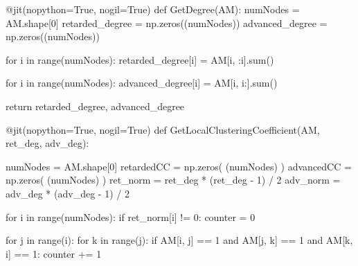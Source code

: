 \documentclass[
  letterpaper,
]{report}
\newenvironment{Shaded}{\begin{snugshade}}{\end{snugshade}}
\newcommand{\AttributeTok}[1]{\textcolor[rgb]{0.40,0.45,0.13}{#1}}
\newcommand{\BuiltInTok}[1]{\textcolor[rgb]{0.00,0.23,0.31}{#1}}
\newcommand{\ControlFlowTok}[1]{\textcolor[rgb]{0.00,0.23,0.31}{#1}}
\newcommand{\DecValTok}[1]{\textcolor[rgb]{0.68,0.00,0.00}{#1}}
\newcommand{\KeywordTok}[1]{\textcolor[rgb]{0.00,0.23,0.31}{#1}}
\newcommand{\NormalTok}[1]{\textcolor[rgb]{0.00,0.23,0.31}{#1}}
\newcommand{\OperatorTok}[1]{\textcolor[rgb]{0.37,0.37,0.37}{#1}}
\newcommand{\VariableTok}[1]{\textcolor[rgb]{0.07,0.07,0.07}{#1}}
\begin{document}
\begin{Shaded}
\begin{Highlighting}[]
\AttributeTok{@jit}\NormalTok{(nopython}\OperatorTok{=}\VariableTok{True}\NormalTok{, nogil}\OperatorTok{=}\VariableTok{True}\NormalTok{) }
\KeywordTok{def}\NormalTok{ GetDegree(AM):}
\NormalTok{    numNodes }\OperatorTok{=}\NormalTok{ AM.shape[}\DecValTok{0}\NormalTok{]}
\NormalTok{    retarded\_degree }\OperatorTok{=}\NormalTok{ np.zeros((numNodes))}
\NormalTok{    advanced\_degree }\OperatorTok{=}\NormalTok{ np.zeros((numNodes))}
     
    \ControlFlowTok{for}\NormalTok{ i }\KeywordTok{in} \BuiltInTok{range}\NormalTok{(numNodes):}
\NormalTok{        retarded\_degree[i] }\OperatorTok{=}\NormalTok{ AM[i, :i].}\BuiltInTok{sum}\NormalTok{()}

    \ControlFlowTok{for}\NormalTok{ i }\KeywordTok{in} \BuiltInTok{range}\NormalTok{(numNodes):}
\NormalTok{        advanced\_degree[i] }\OperatorTok{=}\NormalTok{ AM[i, i:].}\BuiltInTok{sum}\NormalTok{()}
        
    \ControlFlowTok{return}\NormalTok{ retarded\_degree, advanced\_degree}


\AttributeTok{@jit}\NormalTok{(nopython}\OperatorTok{=}\VariableTok{True}\NormalTok{, nogil}\OperatorTok{=}\VariableTok{True}\NormalTok{) }
\KeywordTok{def}\NormalTok{ GetLocalClusteringCoefficient(AM, ret\_deg, adv\_deg):}
    
\NormalTok{    numNodes }\OperatorTok{=}\NormalTok{ AM.shape[}\DecValTok{0}\NormalTok{]}
\NormalTok{    retardedCC }\OperatorTok{=}\NormalTok{ np.zeros( (numNodes) )}
\NormalTok{    advancedCC }\OperatorTok{=}\NormalTok{ np.zeros( (numNodes) )}
\NormalTok{    ret\_norm }\OperatorTok{=}\NormalTok{ ret\_deg }\OperatorTok{*}\NormalTok{ (ret\_deg }\OperatorTok{{-}} \DecValTok{1}\NormalTok{) }\OperatorTok{/} \DecValTok{2}
\NormalTok{    adv\_norm }\OperatorTok{=}\NormalTok{ adv\_deg }\OperatorTok{*}\NormalTok{ (adv\_deg }\OperatorTok{{-}} \DecValTok{1}\NormalTok{) }\OperatorTok{/} \DecValTok{2}
    
    \ControlFlowTok{for}\NormalTok{ i }\KeywordTok{in} \BuiltInTok{range}\NormalTok{(numNodes):}
        \ControlFlowTok{if}\NormalTok{ ret\_norm[i] }\OperatorTok{!=} \DecValTok{0}\NormalTok{: }
\NormalTok{            counter }\OperatorTok{=} \DecValTok{0}
            
            \ControlFlowTok{for}\NormalTok{ j }\KeywordTok{in} \BuiltInTok{range}\NormalTok{(i):}
                \ControlFlowTok{for}\NormalTok{ k }\KeywordTok{in} \BuiltInTok{range}\NormalTok{(j): }
                    \ControlFlowTok{if}\NormalTok{ AM[i, j] }\OperatorTok{==} \DecValTok{1} \KeywordTok{and}\NormalTok{ AM[j, k] }\OperatorTok{==} \DecValTok{1} \KeywordTok{and}\NormalTok{ AM[k, i] }\OperatorTok{==} \DecValTok{1}\NormalTok{: }
\NormalTok{                        counter }\OperatorTok{+=} \DecValTok{1}
                        

\end{Highlighting}
\end{Shaded}
\end{document}
